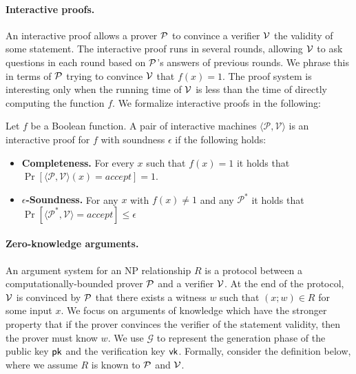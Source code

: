 \paragraph{Interactive proofs.} An interactive proof allows a prover $\P$ to convince a verifier $\V$ the validity of some statement. The interactive proof runs in several rounds, allowing $\V$ to ask questions in each round based on $\P$'s answers of previous rounds. We phrase this in terms of $\P$ trying to convince $\V$ that $f(x)=1$. The proof system is interesting only when the running time of $\V$ is less than the time of directly computing the function $f$. We formalize interactive proofs in the following:	
\begin{definition}\label{def:ip}
	Let $f$ be a Boolean function. A pair of interactive machines $\langle\mathcal{P}, \mathcal{V}\rangle$ is an interactive proof for $f$ with soundness $\epsilon$ if the following holds:
	\begin{itemize}
		\item {\bf Completeness.} For every $x$ such that $f(x) = 1$ it holds that $\Pr[\langle\mathcal{P}, \mathcal{V}\rangle(x)=accept]=1$.
		\item {\bf $\epsilon$-Soundness.} For any $x$ with $f(x) \neq 1$ and any $\mathcal{P}^*$ it holds that $\Pr[\langle\mathcal{P^*},\mathcal{V}\rangle=accept] \le \epsilon$
	\end{itemize}
\end{definition}


\paragraph{Zero-knowledge arguments.} An argument system for an NP relationship $R$ is a protocol between a computationally-bounded prover $\P$ and a verifier $\V$. At the end of the protocol, $\V$ is convinced by $\P$ that there exists a witness $w$ such that $(x; w) \in R$ for some input $x$. We focus on arguments of knowledge which have the stronger property that if the prover convinces the verifier of the statement validity, then the prover must know $w$. We use $\mathcal{G}$ to represent the generation phase of the public key $\pk$ and the verification key $\vk$. Formally, consider the definition below, where we assume $R$ is known to $\P$ and $\V$.

